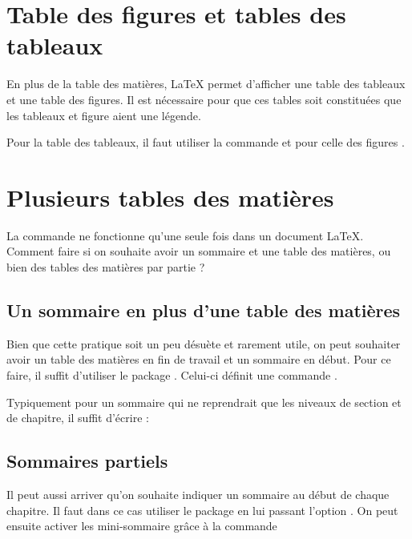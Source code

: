 \section{Table des figures et tables des tableaux}\label{tablefigure}

En plus de la table des matières, \LaTeX{} permet d'afficher une table des tableaux et une table des figures. Il est nécessaire pour que ces tables soit constituées que les tableaux et figure aient une légende.

Pour la table des tableaux, il faut utiliser la commande  et pour celle des figures  .



\section{Plusieurs tables des matières}

La commande  ne fonctionne qu'une seule fois dans un document \LaTeX{}. Comment faire si on souhaite avoir un sommaire et une table des matières, ou bien des tables des matières par partie ?

\subsection{Un sommaire en plus d'une table des matières}

Bien que cette pratique soit un peu désuète et rarement utile, on peut souhaiter  avoir un table des matières en fin de travail et un sommaire en début.
Pour ce faire, il suffit d'utiliser le package . Celui-ci définit une commande 
.

Typiquement pour un sommaire qui ne reprendrait que les niveaux de section et de chapitre, il suffit d'écrire :

\begin{latexcode}
\end{latexcode}




\subsection{Sommaires partiels}

Il peut aussi arriver qu'on souhaite indiquer un sommaire au début de chaque chapitre. Il faut dans ce cas utiliser le package  en lui passant l'option . On peut ensuite activer les mini-sommaire grâce à la commande 

